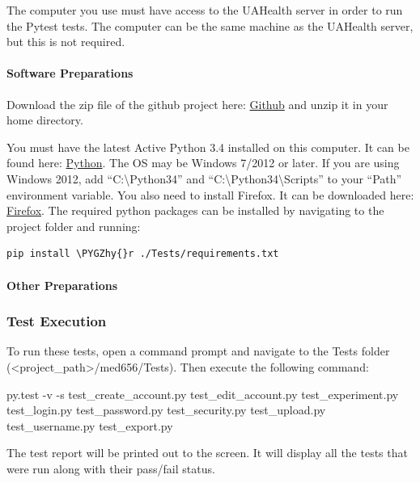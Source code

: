 \documentclass[letterpaper,10pt,english]{sphinxmanual}
\def\PYGZhy{\char`\-}
\begin{document}
The computer you use must have access to the UAHealth server in order to run the Pytest tests.
The computer can be the same machine as the UAHealth server, but this is not required.


\paragraph{Software Preparations}
\label{STD/pytest_test_descriptions:software-preparations}
Download the zip file of the github project here: \href{https://github.com/trwq63/med656}{Github} and unzip it in your home directory.

You must have the latest Active Python 3.4 installed on this computer. It can be found here: \href{http://www.activestate.com/activepython/downloads}{Python}. The OS may be Windows
7/2012 or later. If you are using Windows 2012, add ``C:\textbackslash{}Python34'' and ``C:\textbackslash{}Python34\textbackslash{}Scripts'' to your ``Path'' environment variable. You also need to install Firefox. It can be downloaded here: \href{https://www.mozilla.org/en-US/firefox/new/}{Firefox}. The required python packages can be installed by navigating to the project folder and running:

\begin{Verbatim}[commandchars=\\\{\}]
pip install \PYGZhy{}r ./Tests/requirements.txt
\end{Verbatim}


\paragraph{Other Preparations}
\label{STD/pytest_test_descriptions:other-preparations}\label{STD/pytest_test_descriptions:github}

\subsubsection{Test Execution}
\label{STD/pytest_test_descriptions:test-execution}
To run these tests, open a command prompt and navigate to the Tests folder (\textless{}project\_path\textgreater{}/med656/Tests). Then execute
the following command:

py.test -v -s test\_create\_account.py test\_edit\_account.py test\_experiment.py test\_login.py test\_password.py test\_security.py test\_upload.py test\_username.py test\_export.py

The test report will be printed out to the screen. It will display all the tests that were run along with their pass/fail
status.
\end{document}
